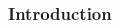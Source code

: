 \documentclass[10pt,compress,unknownkeysallowed]{beamer}
\begin{document}
\begin{frame}
 \frametitle{Introduction}
   \begin{columns}
     \begin{column}[l]{0.5\linewidth}
         \begin{center}
         \end{center}
     \end{column}
     \begin{column}[l]{0.5\linewidth}
         \begin{flushleft}
         \end{flushleft}
     \end{column}         
   \end{columns}

\end{frame}
\end{document}

